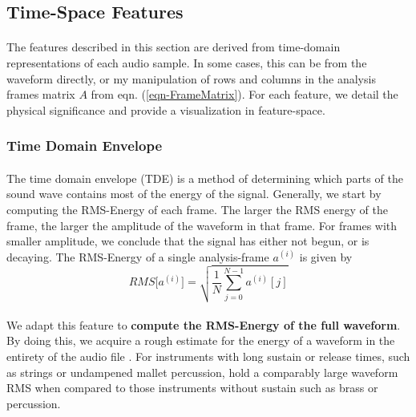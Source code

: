 \documentclass[12pt,letterpaper]{article}
\begin{document}

\newpage

\subsection{Time-Space Features}
\label{subsec-time}

\paragraph*{}The features described in this section are derived from time-domain representations of each audio sample. In some cases, this can be from the waveform directly, or my manipulation of rows and columns in the analysis frames matrix $A$ from eqn. (\ref{eqn-FrameMatrix}). For each feature, we detail the physical significance and provide a visualization in feature-space.

\subsubsection{Time Domain Envelope}

\paragraph*{}The time domain envelope (TDE) is a method of determining which parts of the sound wave contains most of the energy of the signal. Generally, we start by computing the RMS-Energy of each frame. The larger the RMS energy of the frame, the larger the amplitude of the waveform in that frame. For frames with smaller amplitude, we conclude that the signal has either not begun, or is decaying. The RMS-Energy of a single analysis-frame $a^{(i)}$ is given by \cite{Olson,Virtanen}
\begin{equation}
\label{eqn-RMS}
RMS\big[ a^{(i)} \big] = \sqrt{\frac{1}{N} \sum_{j=0}^{N-1}a^{(i)}[j]}
\end{equation}

\paragraph*{}We adapt this feature to \textbf{compute the RMS-Energy of the full waveform}. By doing this, we acquire a rough estimate for the energy of a waveform in the entirety of the audio file \cite{Liu}. For instruments with long sustain or release times, such as strings or undampened mallet percussion, hold a comparably large waveform RMS when compared to those instruments without sustain such as brass or percussion.
\end{document}
